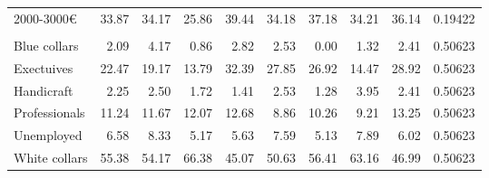\begin{table}[!h]
{\begin{tabular}[t]{lrrrrrrrrr}
\hspace{1em}2000-3000€ & 33.87 & 34.17 & 25.86 & 39.44 & 34.18 & 37.18 & 34.21 & 36.14 & 0.19422\\
\addlinespace[0.3em]
\multicolumn{10}{l}{\textbf{Profession}}\\
\hspace{1em}Blue collars & 2.09 & 4.17 & 0.86 & 2.82 & 2.53 & 0.00 & 1.32 & 2.41 & 0.50623\\
\hspace{1em}Exectuives & 22.47 & 19.17 & 13.79 & 32.39 & 27.85 & 26.92 & 14.47 & 28.92 & 0.50623\\
\hspace{1em}Handicraft & 2.25 & 2.50 & 1.72 & 1.41 & 2.53 & 1.28 & 3.95 & 2.41 & 0.50623\\
\hspace{1em}Professionals & 11.24 & 11.67 & 12.07 & 12.68 & 8.86 & 10.26 & 9.21 & 13.25 & 0.50623\\
\hspace{1em}Unemployed & 6.58 & 8.33 & 5.17 & 5.63 & 7.59 & 5.13 & 7.89 & 6.02 & 0.50623\\
\hspace{1em}White collars & 55.38 & 54.17 & 66.38 & 45.07 & 50.63 & 56.41 & 63.16 & 46.99 & 0.50623\\
\bottomrule
\end{tabular}}
\end{table}
